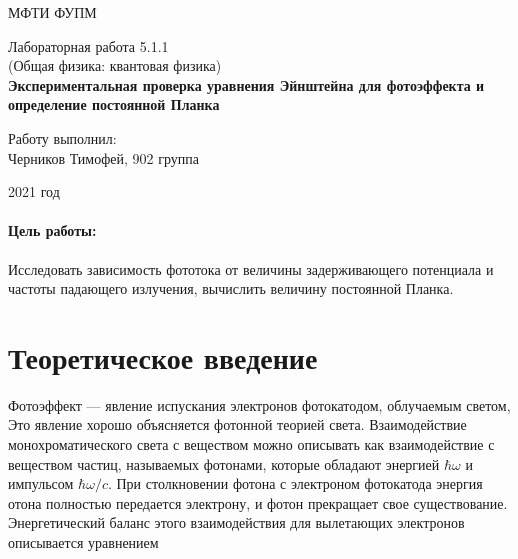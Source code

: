 \documentclass[12pt]{kiarticle} %
\begin{document}
    
    \begin{titlepage}
        \begin{center}
            \large     МФТИ ФУПМ
            \vspace{0.2cm}
            
            \vspace{4.5cm}
            Лабораторная работа 5.1.1  \\ \vspace{0.2cm}
            \large (Общая физика: квантовая физика) \\ \vspace{0.2cm}
            \LARGE \textbf{ Экспериментальная проверка уравнения Эйнштейна
                для фотоэффекта и определение постоянной Планка }
        \end{center}
        \vspace{2.3cm} \large
        
        \begin{center}
            Работу выполнил: \\
            Черников Тимофей,
            902 группа
            \vspace{10mm}

        \end{center}

        \begin{center} \vspace{60mm}
            2021 год
        \end{center}
    \end{titlepage}


    \paragraph*{Цель работы:} 
    Исследовать зависимость фототока от величины задерживающего потенциала и частоты падающего излучения, вычислить величину постоянной Планка.
    
    \section{Теоретическое введение}
    
    Фотоэффект --- явление испускания электронов фотокатодом, облучаемым светом,  Это явление хорошо объясняется фотонной теорией света. Взаимодействие монохроматического света с веществом можно описывать
    как взаимодействие с веществом частиц, называемых фотонами, которые обладают энергией $ \hbar \omega $ и импульсом $ \hbar\omega/c $. При столкновении фотона с электроном фотокатода энергия отона полностью передается электрону, и фотон прекращает свое существование. Энергетический баланс этого взаимодействия для вылетающих электронов
    описывается уравнением
    
\end{document}
